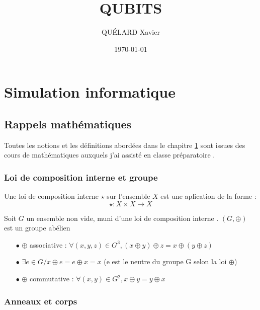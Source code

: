 \documentclass[a4paper,12pt]{report}
\title{QUBITS}
\author{QUÉLARD Xavier}
\date{ \today{} }
\newcommand{\icite}[1]{\up{\textit{\cite{#1}}}}
\begin{document}
%
%

%
\maketitle

\tableofcontents

\chapter{Simulation informatique} \label{chapRappels}
	\section{Rappels mathématiques}

Toutes les notions et les définitions abordées dans le chapitre \ref{chapRappels} sont issues des cours de mathématiques auxquels j'ai assisté en classe préparatoire\icite{ref1} .

		\subsection{Loi de composition interne et groupe}

\par{
Une loi de composition interne $\star{}$ sur l'ensemble $X$ est une aplication de la forme : \[\star : X \times X \rightarrow X\]
}

\par{
	Soit $G$ un ensemble non vide, muni d'une loi de composition interne \oplus. $ (G, \oplus)$ est un groupe abélien  \Leftrightarrow
}

\begin{itemize}
\item[$\bullet$] $\oplus$ associative : $\forall (x,y,z) \in G^3, (x \oplus y) \oplus z = x \oplus ( y \oplus z )$
\item[$\bullet$] $\exists e \in G / x \oplus e = e \oplus x = x$ (e est le neutre du groupe G selon la loi $\oplus$)
\item[$\bullet$] $\oplus$ commutative : $\forall (x,y) \in G^2, x \oplus y = y \oplus x$ \\
\end{itemize}

		\subsection{Anneaux et corps}
\end{document}
